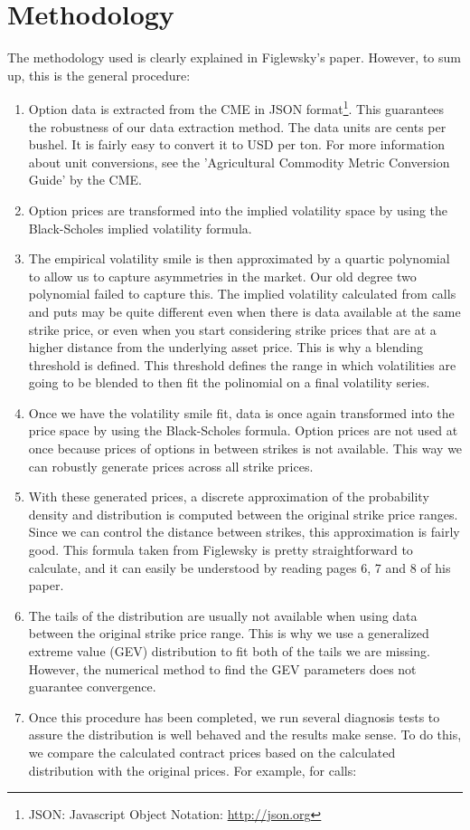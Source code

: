 \documentclass[10pt,a4paper]{book}
\begin{document}
\section{Methodology}
The methodology used is clearly explained in Figlewsky's paper. However, to sum up, this is the general procedure:
\begin{enumerate}
  \item Option data is extracted from the CME in JSON format\footnote{JSON: Javascript Object Notation: \url{http://json.org}}. This guarantees the robustness of our data extraction method. The data units are cents per bushel. It is fairly easy to convert it to USD per ton. For more information about unit conversions, see the 'Agricultural Commodity Metric Conversion Guide' by the CME.
  \item Option prices are transformed into the implied volatility space by using the Black-Scholes implied volatility formula.
\raggedbottom
\pagebreak
  \item The empirical volatility smile is then approximated by a quartic polynomial to allow us to capture asymmetries in the market. Our old degree two polynomial failed to capture this. The implied volatility calculated from calls and puts may be quite different even when there is data available at the same strike price, or even when you start considering strike prices that are at a higher distance from the underlying asset price. This is why a blending threshold is defined. This threshold defines the range in which volatilities are going to be blended to then fit the polinomial on a final volatility series.
  \item Once we have the volatility smile fit, data is once again transformed into the price space by using the Black-Scholes formula. Option prices are not used at once because prices of options in between strikes is not available. This way we can robustly generate prices across all strike prices.
 \item With these generated prices, a discrete approximation of the probability density and distribution is computed between the original strike price ranges. Since we can control the distance between strikes, this approximation is fairly good. This formula taken from Figlewsky is pretty straightforward to calculate, and it can easily be understood by reading pages 6, 7 and 8 of his paper.
  \item The tails of the distribution are usually not available when using data between the original strike price range. This is why we use a generalized extreme value (GEV) distribution to fit both of the tails we are missing. However, the numerical method to find the GEV parameters does not guarantee convergence.
  \item Once this procedure has been completed, we run several diagnosis tests to assure the distribution is well behaved and the results make sense. To do this, we compare the calculated contract prices based on the calculated distribution with the original prices. For example, for calls:


\end{enumerate}
\end{document}
